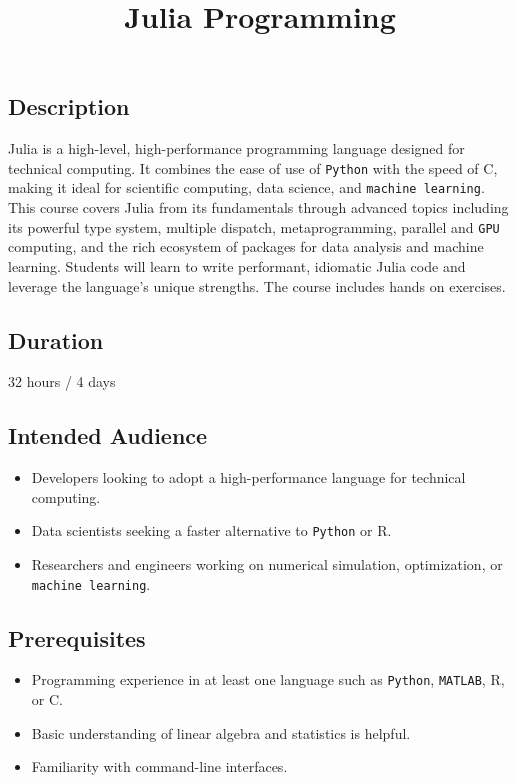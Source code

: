 \documentclass[
]{article}
\title{Julia Programming}
\author{}
\date{}
\providecommand{\tightlist}{%
  \setlength{\itemsep}{0pt}\setlength{\parskip}{0pt}}
\begin{document}
\maketitle

\subsection{Description}\label{description}

Julia is a high-level, high-performance programming language designed
for technical computing. It combines the ease of use of \texttt{Python}
with the speed of C, making it ideal for scientific computing, data
science, and \texttt{machine\ learning}. This course covers Julia from
its fundamentals through advanced topics including its powerful type
system, multiple dispatch, metaprogramming, parallel and \texttt{GPU}
computing, and the rich ecosystem of packages for data analysis and
machine learning. Students will learn to write performant, idiomatic
Julia code and leverage the language's unique strengths. The course
includes hands on exercises.

\subsection{Duration}\label{duration}

32 hours / 4 days

\subsection{Intended Audience}\label{intended-audience}

\begin{itemize}
\tightlist
\item
  Developers looking to adopt a high-performance language for technical
  computing.
\item
  Data scientists seeking a faster alternative to \texttt{Python} or R.
\item
  Researchers and engineers working on numerical simulation,
  optimization, or \texttt{machine\ learning}.
\end{itemize}

\subsection{Prerequisites}\label{prerequisites}

\begin{itemize}
\tightlist
\item
  Programming experience in at least one language such as
  \texttt{Python}, \texttt{MATLAB}, R, or C.
\item
  Basic understanding of linear algebra and statistics is helpful.
\item
  Familiarity with command-line interfaces.
\end{itemize}
\end{document}
